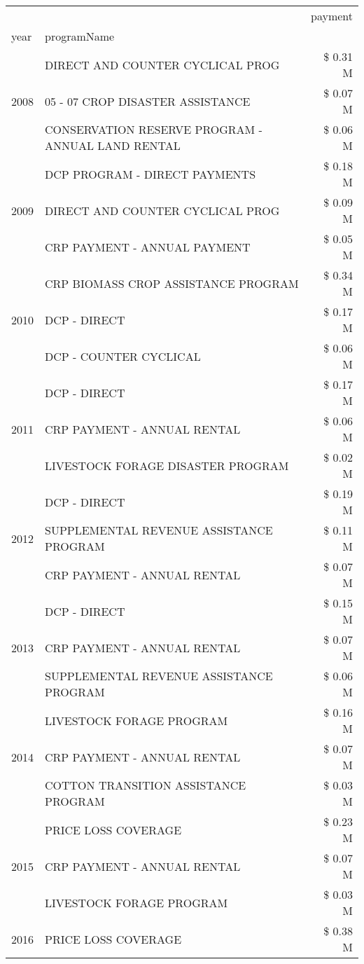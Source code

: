 \begin{tabular}{llr}
\toprule
 &  & payment \\
year & programName &  \\
\midrule
\multirow[t]{3}{*}{2008} & DIRECT AND COUNTER CYCLICAL PROG & \$ 0.31 M \\
 & 05 - 07 CROP DISASTER ASSISTANCE & \$ 0.07 M \\
 & CONSERVATION RESERVE PROGRAM - ANNUAL LAND RENTAL & \$ 0.06 M \\
\cline{1-3}
\multirow[t]{3}{*}{2009} & DCP PROGRAM - DIRECT PAYMENTS & \$ 0.18 M \\
 & DIRECT AND COUNTER CYCLICAL PROG & \$ 0.09 M \\
 & CRP PAYMENT - ANNUAL PAYMENT & \$ 0.05 M \\
\cline{1-3}
\multirow[t]{3}{*}{2010} & CRP BIOMASS CROP ASSISTANCE PROGRAM & \$ 0.34 M \\
 & DCP - DIRECT & \$ 0.17 M \\
 & DCP - COUNTER CYCLICAL & \$ 0.06 M \\
\cline{1-3}
\multirow[t]{3}{*}{2011} & DCP - DIRECT & \$ 0.17 M \\
 & CRP PAYMENT - ANNUAL RENTAL & \$ 0.06 M \\
 & LIVESTOCK FORAGE DISASTER PROGRAM & \$ 0.02 M \\
\cline{1-3}
\multirow[t]{3}{*}{2012} & DCP - DIRECT & \$ 0.19 M \\
 & SUPPLEMENTAL REVENUE ASSISTANCE PROGRAM & \$ 0.11 M \\
 & CRP PAYMENT - ANNUAL RENTAL & \$ 0.07 M \\
\cline{1-3}
\multirow[t]{3}{*}{2013} & DCP - DIRECT & \$ 0.15 M \\
 & CRP PAYMENT - ANNUAL RENTAL & \$ 0.07 M \\
 & SUPPLEMENTAL REVENUE ASSISTANCE PROGRAM & \$ 0.06 M \\
\cline{1-3}
\multirow[t]{3}{*}{2014} & LIVESTOCK FORAGE PROGRAM & \$ 0.16 M \\
 & CRP PAYMENT - ANNUAL RENTAL & \$ 0.07 M \\
 & COTTON TRANSITION ASSISTANCE PROGRAM & \$ 0.03 M \\
\cline{1-3}
\multirow[t]{3}{*}{2015} & PRICE LOSS COVERAGE & \$ 0.23 M \\
 & CRP PAYMENT - ANNUAL RENTAL & \$ 0.07 M \\
 & LIVESTOCK FORAGE PROGRAM & \$ 0.03 M \\
\cline{1-3}
\multirow[t]{3}{*}{2016} & PRICE LOSS COVERAGE & \$ 0.38 M \\

\end{tabular}
